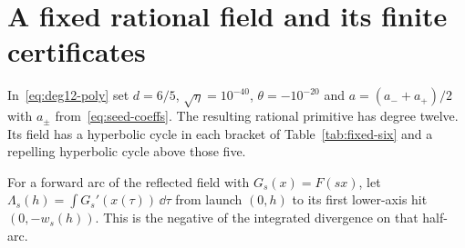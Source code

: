 \section{A fixed rational field and its finite certificates}\label{app:repro}

\begin{proposition}\label{prop:fixed-six}
In~\eqref{eq:deg12-poly} set $d=6/5$, $\sqrt\eta=10^{-40}$,
$\theta=-10^{-20}$ and $a=(a_-+a_+)/2$ with $a_\pm$ from~\eqref{eq:seed-coeffs}.
The resulting rational primitive has degree twelve. Its field has a
hyperbolic cycle in each bracket of Table~\ref{tab:fixed-six} and a
repelling hyperbolic cycle above those five.
\end{proposition}

For a forward arc of the reflected field with $G_s(x)=F(sx)$, let
$\Lambda_s(h)=\int G_s'(x(\tau))\,\dd\tau$ from launch $(0,h)$ to
its first lower-axis hit $(0,-w_s(h))$. This is the negative of the
integrated divergence on that half-arc.



